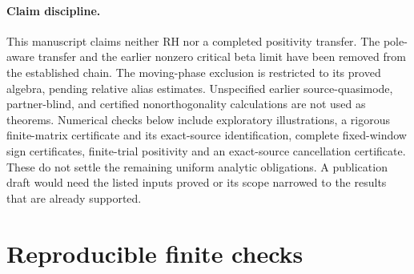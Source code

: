\documentclass[11pt]{article}
\theoremstyle{remark}
\begin{document}
\paragraph{Claim discipline.}
This manuscript claims neither RH nor a completed positivity transfer.
The pole-aware transfer and the earlier nonzero critical beta limit have
been removed from the established chain. The moving-phase exclusion is
restricted to its proved algebra, pending relative alias estimates.
Unspecified earlier source-quasimode, partner-blind, and certified
nonorthogonality calculations are not used as theorems. Numerical checks
below include exploratory illustrations, a rigorous finite-matrix
certificate and its exact-source identification, complete fixed-window
sign certificates, finite-trial positivity and an exact-source
cancellation certificate. These do not settle the remaining uniform
analytic obligations. A publication draft would need the listed inputs
proved or its scope narrowed to the results that are already supported.

\appendix
\section{Reproducible finite checks}\label{app:numerics}
\end{document}
